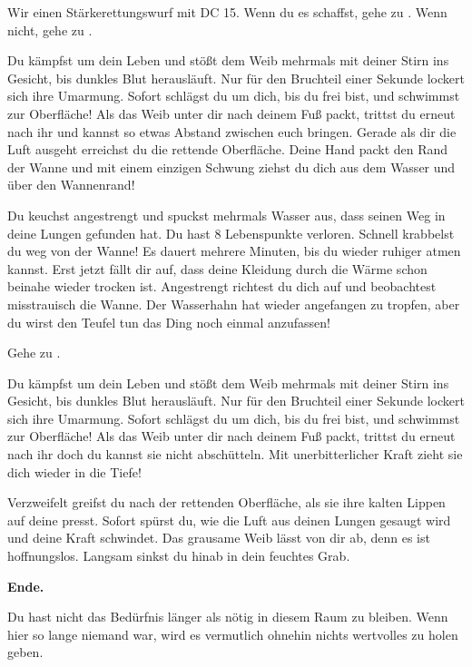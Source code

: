 Wir einen Stärkerettungswurf mit DC 15. Wenn du es schaffst, gehe zu .
Wenn nicht, gehe zu .


Du kämpfst um dein Leben und stößt dem Weib mehrmals mit deiner Stirn ins Gesicht, bis dunkles Blut herausläuft. Nur für den Bruchteil einer Sekunde lockert sich ihre Umarmung. Sofort schlägst du um dich, bis du frei bist, und schwimmst zur Oberfläche! Als das Weib unter dir nach deinem Fuß packt, trittst du erneut nach ihr und kannst so etwas Abstand zwischen euch bringen. Gerade als dir die Luft ausgeht erreichst du die rettende Oberfläche. Deine Hand packt den Rand der Wanne und mit einem einzigen Schwung ziehst du dich aus dem Wasser und über den Wannenrand!

Du keuchst angestrengt und spuckst mehrmals Wasser aus, dass seinen Weg in deine Lungen gefunden hat. Du hast 8 Lebenspunkte verloren. Schnell krabbelst du weg von der Wanne! Es dauert mehrere Minuten, bis du wieder ruhiger atmen kannst.
Erst jetzt fällt dir auf, dass deine Kleidung durch die Wärme schon beinahe wieder trocken ist. Angestrengt richtest du dich auf und beobachtest misstrauisch die Wanne.
Der Wasserhahn hat wieder angefangen zu tropfen, aber du wirst den Teufel tun das Ding noch einmal anzufassen!

Gehe zu .


Du kämpfst um dein Leben und stößt dem Weib mehrmals mit deiner Stirn ins Gesicht, bis dunkles Blut herausläuft. Nur für den Bruchteil einer Sekunde lockert sich ihre Umarmung. Sofort schlägst du um dich, bis du frei bist, und schwimmst zur Oberfläche! Als das Weib unter dir nach deinem Fuß packt, trittst du erneut nach ihr doch du kannst sie nicht abschütteln. Mit unerbitterlicher Kraft zieht sie dich wieder in die Tiefe!

Verzweifelt greifst du nach der rettenden Oberfläche, als sie ihre kalten Lippen auf deine presst. Sofort spürst du, wie die Luft aus deinen Lungen gesaugt wird und deine Kraft schwindet.
Das grausame Weib lässt von dir ab, denn es ist hoffnungslos.
Langsam sinkst du hinab in dein feuchtes Grab.

\textbf{Ende.}


Du hast nicht das Bedürfnis länger als nötig in diesem Raum zu bleiben. Wenn hier so lange niemand war, wird es vermutlich ohnehin nichts wertvolles zu holen geben.

